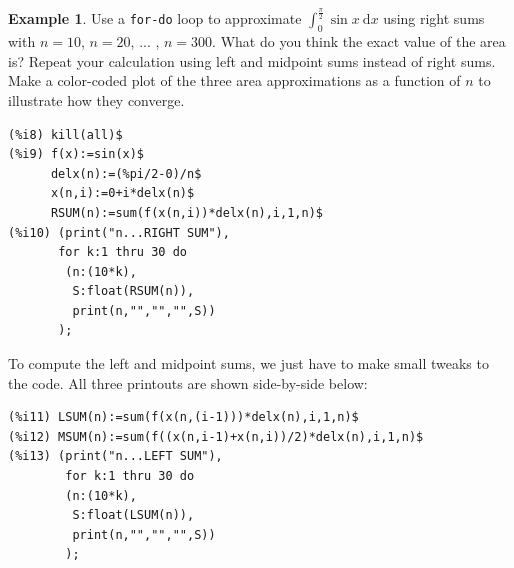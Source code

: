 \documentclass[10.5pt,twoside]{report}
\theoremstyle{definition}
\newtheorem{exmp}{Example}[section]
\begin{document}
\begin{exmp}  Use a \verb|for-do| loop to approximate $\displaystyle \int_{0}^{\frac{\pi}{2}} \sin{x} \ \mathrm{d}x$ using right sums with $n=10$, $n=20$, ... , $n=300$.  What do you think the exact value of the area is?    Repeat your calculation using left and midpoint sums instead of right sums.  Make a color-coded plot of the three area approximations as a function of $n$ to illustrate how they converge.\\

\begin{verbatim}
(%i8) kill(all)$
(%i9) f(x):=sin(x)$
      delx(n):=(%pi/2-0)/n$
      x(n,i):=0+i*delx(n)$
      RSUM(n):=sum(f(x(n,i))*delx(n),i,1,n)$
(%i10) (print("n...RIGHT SUM"),
       for k:1 thru 30 do
        (n:(10*k),
         S:float(RSUM(n)),
         print(n,"","","",S))
       );
\end{verbatim}       
 
To compute the left and midpoint sums, we just have to make small tweaks to the code.  All three printouts are shown side-by-side below:

\begin{verbatim}
(%i11) LSUM(n):=sum(f(x(n,(i-1)))*delx(n),i,1,n)$
(%i12) MSUM(n):=sum(f((x(n,i-1)+x(n,i))/2)*delx(n),i,1,n)$
(%i13) (print("n...LEFT SUM"),
        for k:1 thru 30 do
        (n:(10*k),
         S:float(LSUM(n)),
         print(n,"","","",S))
        );
        

\end{verbatim}
\end{exmp}
\end{document}
